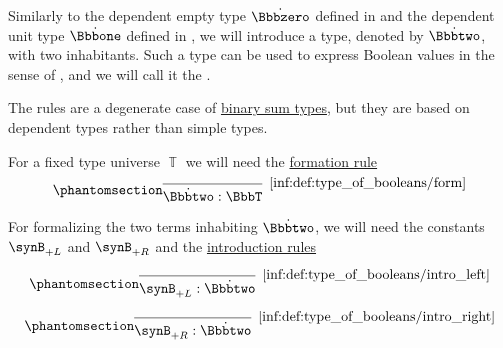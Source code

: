 \begin{definition}\label{def:type_of_booleans}
  Similarly to the dependent empty type \( \syn\Bbbzero \) defined in  and the dependent unit type \( \syn\Bbbone \) defined in , we will introduce a type, denoted by \( \syn\Bbbtwo \), with two inhabitants. Such a type can be used to express Boolean values in the sense of , and we will call it the .

  The rules are a degenerate case of \hyperref[def:simple_sum_type]{binary sum types}, but they are based on dependent types rather than simple types.

  For a fixed type universe \( \BbbT \) we will need the \hyperref[rem:type_theory_rule_classification/form]{formation rule}
  \begin{equation*}\taglabel[\ensuremath{ \Bbbtwo_{\logic{form}} }]{inf:def:type_of_booleans/form}
    \begin{prooftree}
      \infer0[\ref{inf:def:type_of_booleans/form}]{ \syn\Bbbtwo: \BbbT }
    \end{prooftree}
  \end{equation*}

  For formalizing the two terms inhabiting \( \syn\Bbbtwo \), we will need the constants \( \synB_{+L} \) and \( \synB_{+R} \) and the \hyperref[rem:type_theory_rule_classification/intro]{introduction rules}
  \begin{paracol}{2}
    \begin{leftcolumn}
      \ParacolAlignmentHack
      \begin{equation*}\taglabel[\ensuremath{ \Bbbtwo_{+L} }]{inf:def:type_of_booleans/intro_left}
        \begin{prooftree}
          \infer0[\ref{inf:def:type_of_booleans/intro_left}]{ \synB_{+L}: \syn\Bbbtwo }
        \end{prooftree}
      \end{equation*}
    \end{leftcolumn}

    \begin{rightcolumn}
      \ParacolAlignmentHack
      \begin{equation*}\taglabel[\ensuremath{ \Bbbtwo_{+R} }]{inf:def:type_of_booleans/intro_right}
        \begin{prooftree}
          \infer0[\ref{inf:def:type_of_booleans/intro_right}]{ \synB_{+R}: \syn\Bbbtwo }
        \end{prooftree}
      \end{equation*}
    \end{rightcolumn}
  \end{paracol}


\end{definition}
